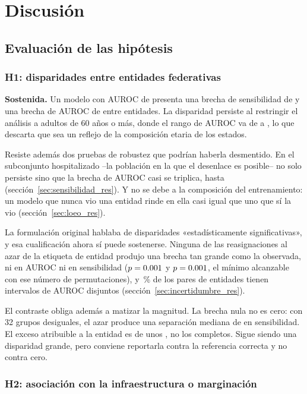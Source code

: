 \chapter{Discusión}
\label{cap:discusion}

\section{Evaluación de las hipótesis}

\subsection*{H1: disparidades entre entidades federativas}

\textbf{Sostenida.} Un modelo con AUROC de \aurocGlobal{} presenta una brecha de
sensibilidad de \gapTPRentidad{} y una brecha de AUROC de \gapAUROCentidad{} entre
entidades. La disparidad persiste al restringir el análisis a adultos de 60 años o
más, donde el rango de AUROC va de \sesentaPeorAUROC{} a \sesentaMejorAUROC, lo
que descarta que sea un reflejo de la composición etaria de los estados.

Resiste además dos pruebas de robustez que podrían haberla desmentido. En el
subconjunto hospitalizado --la población en la que el desenlace es posible-- no
solo persiste sino que la brecha de AUROC casi se triplica, hasta \hospGapAUROC{}
(sección~\ref{sec:sensibilidad_res}). Y no se debe a la composición del
entrenamiento: un modelo que nunca vio una entidad rinde en ella casi igual que
uno que sí la vio (sección~\ref{sec:loeo_res}).

La formulación original hablaba de disparidades «estadísticamente
significativas», y esa cualificación ahora sí puede sostenerse. Ninguna de las
\boP{} reasignaciones al azar de la etiqueta de entidad produjo una brecha tan
grande como la observada, ni en AUROC ni en sensibilidad ($p=0.001$ y
$p=0.001$, el mínimo alcanzable con ese número de permutaciones), y
\paresPct\,\% de los pares de entidades tienen intervalos de AUROC disjuntos
(sección~\ref{sec:incertidumbre_res}).

El contraste obliga además a matizar la magnitud. La brecha nula no es cero: con
32 grupos desiguales, el azar produce una separación mediana de \nulaTpr{} en
sensibilidad. El exceso atribuible a la entidad es de unos \excesoTpr, no los
\gapTPRentidad{} completos. Sigue siendo una disparidad grande, pero conviene
reportarla contra la referencia correcta y no contra cero.

\subsection*{H2: asociación con la infraestructura o marginación}

